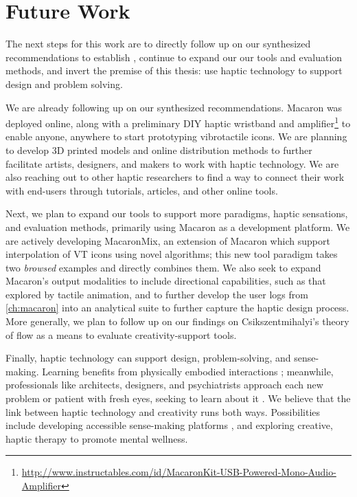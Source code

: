 %
%
\section{Future Work}
The next steps for this work are to directly follow up on our synthesized recommendations to establish \haxd, continue to expand our our tools and evaluation methods, and invert the premise of this thesis: use haptic technology to support design and problem solving.

We are already following up on our synthesized recommendations.
Macaron was deployed online, along with a preliminary DIY haptic wristband and amplifier\footnote{\url{http://www.instructables.com/id/MacaronKit-USB-Powered-Mono-Audio-Amplifier}} to enable anyone, anywhere to start prototyping vibrotactile icons.
We are planning to develop 3D printed models and online distribution methods to further facilitate artists, designers, and makers to work with haptic technology.
We are also reaching out to other haptic researchers to find a way to connect their work with end-users through tutorials, articles, and other online tools.

Next, we plan to expand our tools to support more paradigms, haptic sensations, and evaluation methods, primarily using Macaron as a development platform.
We are actively developing MacaronMix, an extension of Macaron which support interpolation of VT icons using novel algorithms; this new tool paradigm takes two \emph{browsed} examples and directly combines them.
We also seek to expand Macaron's output modalities to include directional capabilities, such as that explored by tactile animation, and to further develop the user logs from \autoref{ch:macaron} into an analytical suite to further capture the haptic design process.
More generally, we plan to follow up on our findings on Csikszentmihalyi's theory of flow \cite{Csikszentmihalyi1996} as a means to evaluate creativity-support tools.

Finally, haptic technology can support design, problem-solving, and sense-making.
Learning benefits from physically embodied interactions \cite{Papert1980}; meanwhile, professionals like architects, designers, and psychiatrists approach each new problem or patient with fresh eyes, seeking to learn about it \cite{Schon1982}.
We believe that the link between haptic technology and creativity runs both ways.
Possibilities include developing accessible sense-making platforms \cite{Swaminathan2016}, and exploring creative, haptic therapy to promote mental wellness.

